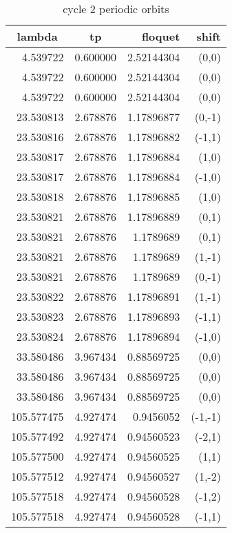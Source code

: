\begin{table}[htbp]
  \centering
  \caption{cycle 2 periodic orbits}
    \begin{tabular}{|r|r|r|r|}
    \hline
    \multicolumn{1}{|c|}{lambda} & \multicolumn{1}{|c|}{tp} & floquet & shift \\\hline
    4.539722 & 0.600000 & 2.52144304 & (0,0) \\
    4.539722 & 0.600000 & 2.52144304 & (0,0) \\
    4.539722 & 0.600000 & 2.52144304 & (0,0) \\
    23.530813 & 2.678876 & 1.17896877 & (0,-1) \\
    23.530816 & 2.678876 & 1.17896882 & (-1,1) \\
    23.530817 & 2.678876 & 1.17896884 & (1,0) \\
    23.530817 & 2.678876 & 1.17896884 & (-1,0) \\
    23.530818 & 2.678876 & 1.17896885 & (1,0) \\
    23.530821 & 2.678876 & 1.17896889 & (0,1) \\
    23.530821 & 2.678876 & 1.1789689 & (0,1) \\
    23.530821 & 2.678876 & 1.1789689 & (1,-1) \\
    23.530821 & 2.678876 & 1.1789689 & (0,-1) \\
    23.530822 & 2.678876 & 1.17896891 & (1,-1) \\
    23.530823 & 2.678876 & 1.17896893 & (-1,1) \\
    23.530824 & 2.678876 & 1.17896894 & (-1,0) \\
    33.580486 & 3.967434 & 0.88569725 & (0,0) \\
    33.580486 & 3.967434 & 0.88569725 & (0,0) \\
    33.580486 & 3.967434 & 0.88569725 & (0,0) \\
    105.577475 & 4.927474 & 0.9456052 & (-1,-1) \\
    105.577492 & 4.927474 & 0.94560523 & (-2,1) \\
    105.577500 & 4.927474 & 0.94560525 & (1,1) \\
    105.577512 & 4.927474 & 0.94560527 & (1,-2) \\
    105.577518 & 4.927474 & 0.94560528 & (-1,2) \\
    105.577518 & 4.927474 & 0.94560528 & (-1,1) \\
    \hline
    \end{tabular}%
  \label{tab:length2withfloquet}%
\end{table}%



